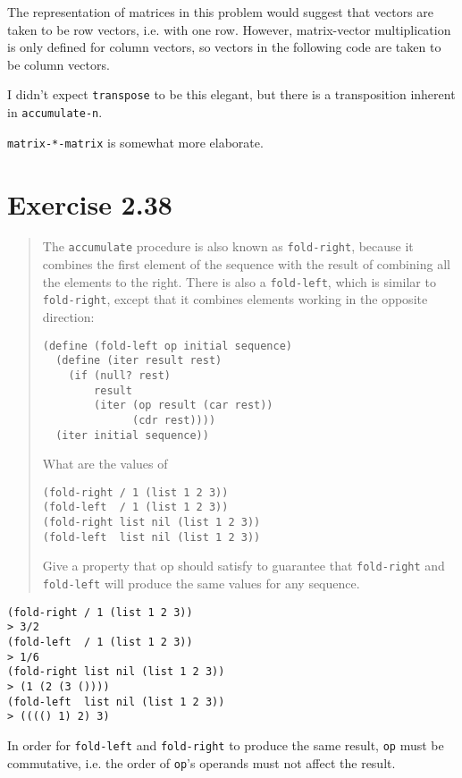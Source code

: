 \documentclass{article}
\begin{document}
The representation of matrices in this problem would suggest that vectors are
taken to be row vectors, i.e. with one row. However, matrix-vector
multiplication is only defined for column vectors, so vectors in the following
code are taken to be column vectors.


I didn't expect \texttt{transpose} to be this elegant, but there is a
transposition inherent in \texttt{accumulate-n}.

\texttt{matrix-*-matrix} is somewhat more elaborate.


\section{Exercise 2.38}
\begin{quote}
    The \texttt{accumulate} procedure is also known as \texttt{fold-right},
    because it combines the first element of the sequence with the result of
    combining all the elements to the right. There is also a
    \texttt{fold-left}, which is similar to \texttt{fold-right}, except that it
    combines elements working in the opposite direction:
    \begin{lstlisting}
(define (fold-left op initial sequence)
  (define (iter result rest)
    (if (null? rest)
        result
        (iter (op result (car rest))
              (cdr rest))))
  (iter initial sequence))
    \end{lstlisting}
    What are the values of
    \begin{lstlisting}
(fold-right / 1 (list 1 2 3))
(fold-left  / 1 (list 1 2 3))
(fold-right list nil (list 1 2 3))
(fold-left  list nil (list 1 2 3))
    \end{lstlisting}
    Give a property that op should satisfy to guarantee that
    \texttt{fold-right} and \texttt{fold-left} will produce the same values for
    any sequence.
\end{quote}

\begin{lstlisting}
(fold-right / 1 (list 1 2 3))
> 3/2
(fold-left  / 1 (list 1 2 3))
> 1/6
(fold-right list nil (list 1 2 3))
> (1 (2 (3 ())))
(fold-left  list nil (list 1 2 3))
> (((() 1) 2) 3)
\end{lstlisting}

In order for \texttt{fold-left} and \texttt{fold-right} to produce the same
result, \texttt{op} must be commutative, i.e. the order of \texttt{op}'s
operands must not affect the result.
\end{document}
